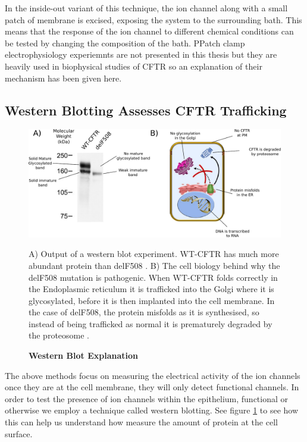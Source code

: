In the inside-out variant of this technique, the ion channel along with a small patch of membrane is excised, exposing the system to the surrounding bath. This means that the response of the ion channel to different chemical conditions can be tested by changing the composition of the bath. PPatch clamp electrophysiology experiemnts are not presented in this thesis but they are heavily used in biophysical studies of CFTR so an explanation of their mechanism has been given here.

\subsection{Western Blotting Assesses CFTR Trafficking}
\begin{figure}
	\label{western_blot}
	\begin{center}
	\includegraphics[width=1\textwidth]{figures/western_blot_explanation.pdf}
	\end{center}
	\captionsetup{singlelinecheck = false, justification=raggedright}
	\caption[Western Blot Explanation] {\textbf{Western Blot Explanation}}{A) Output of a western blot experiment. WT-CFTR has much more abundant protein than delF508 \cite{chang2008}. B) The cell biology behind why the delF508 mutation is pathogenic. When WT-CFTR folds correctly in the Endoplasmic reticulum it is trafficked into the Golgi where it is glycosylated, before it is then implanted into the cell membrane. In the case of delF508, the protein misfolds as it is synthesised, so instead of being trafficked as normal it is prematurely degraded by the proteosome \cite{lopes-pacheco2016a}.} 
\end{figure}
The above methods focus on measuring the electrical activity of the ion channels once they are at the cell membrane, they will only detect functional channels. In order to test the presence of ion channels within the epithelium, functional or otherwise we employ a technique called western blotting. See figure \ref{western_blot} to see how this can help us understand how measure the amount of protein at the cell surface. 

